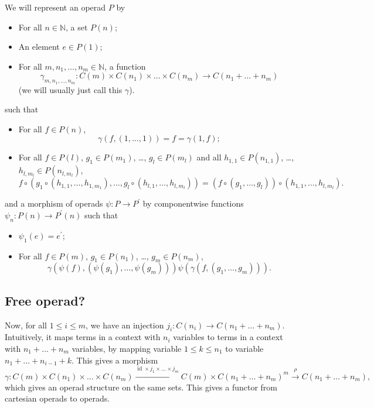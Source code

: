 \documentclass{amsbook}
\begin{document}
  We will represent an operad $ P $ by
  \begin{itemize}
    \item For all $ n \in \mathbb N $, a set $ P(n) $;
    \item An element $ e \in P(1) $;
    \item For all $ m, n_1, \dots, n_m \in \mathbb N $, a function
      \[ \gamma_{m, n_1, \dots, n_m}: C(m) \times C(n_1) \times \dots \times C(n_m) \to C(n_1 + \dots + n_m) \]
      (we will usually just call this $ \gamma $).
  \end{itemize}
  such that
  \begin{itemize}
    \item For all $ f \in P(n) $,
      \[ \gamma(f, (1, \dots, 1)) = f = \gamma(1, f); \]
    \item For all $ f \in P(l) $, $ g_1 \in P(m_1) $, \dots, $ g_l \in P(m_l) $ and all $ h_{1, 1} \in P(n_{1, 1}) $, \dots, $ h_{l, m_l} \in P(n_{l, m_l}) $,
      \[ f \circ(g_1 \circ(h_{1, 1}, \dots, h_{1, m_1}), \dots, g_l \circ (h_{l, 1}, \dots, h_{l, m_l})) = (f \circ (g_1, \dots, g_l)) \circ (h_{1, 1}, \dots, h_{l, m_l}). \]
  \end{itemize}
  and a morphism of operads $ \psi: P \to P^\prime $ by componentwise functions $ \psi_n: P(n) \to P^\prime(n) $ such that
  \begin{itemize}
    \item $ \psi_1(e) = e^\prime $;
    \item For all $ f \in P(m) $, $ g_1 \in P(n_1) $, \dots, $ g_m \in P(n_m) $,
      \[ \gamma(\psi(f), (\psi(g_1), \dots, \psi(g_m)))  \psi(\gamma(f, (g_1, \dots, g_m))). \]
  \end{itemize}

  \subsection{Free operad?}
  Now, for all $ 1 \leq i \leq m $, we have an injection $ j_i: C(n_i) \to C(n_1 + \dots + n_m) $. Intuitively, it maps terms in a context with $ n_i $ variables to terms in a context with $ n_1 + \dots + n_m $ variables, by mapping variable $ 1 \leq k \leq n_1 $ to variable $ n_1 + \dots + n_{i - 1} + k $. This gives a morphism
  \[ \gamma: C(m) \times C(n_1) \times \dots \times C(n_m) \xrightarrow{\mathop{id} \times j_1 \times \dots \times j_m} C(m) \times C(n_1 + \dots + n_m)^m \xrightarrow{\rho} C(n_1 + \dots + n_m), \]
  which gives an operad structure on the same sets. This gives a functor from cartesian operads to operads.
\end{document}
